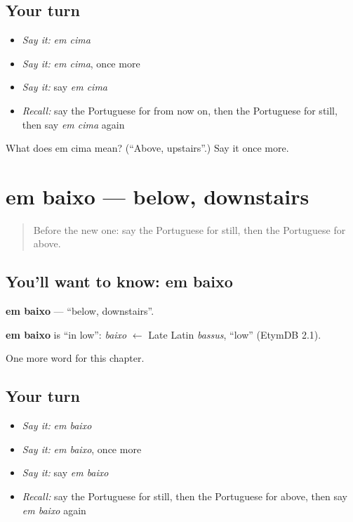 \subsection*{Your turn}
\begin{itemize}
\raggedright
  \item \emph{Say it:} \emph{em cima}
  \item \emph{Say it:} \emph{em cima}, once more
  \item \emph{Say it:} say \emph{em cima}
  \item \emph{Recall:} say the Portuguese for from now on, then the Portuguese for still, then say \emph{em cima} again
\end{itemize}

\begin{tcolorbox}[breakable,colback=teal!4,colframe=teal!35!black,title={Before you move on}]
What does em cima mean? (\textquotedblleft{}Above, upstairs\textquotedblright{}.) Say it once more.
\end{tcolorbox}
\section[em baixo]{em baixo — below, downstairs}

\label{lesson:PT-C151-em-baixo}



\begin{quote}
Before the new one: say the Portuguese for still, then the Portuguese for above.
\end{quote}

\subsection*{You'll want to know: em baixo}
\textbf{em baixo} — \textquotedblleft{}below, downstairs\textquotedblright{}.

\begin{cousinweb}
\textbf{em baixo} is \textquotedblleft{}in low\textquotedblright{}: \emph{baixo} $\leftarrow$ Late Latin \emph{bassus}, \textquotedblleft{}low\textquotedblright{} (EtymDB 2.1).
\end{cousinweb}

\begin{grammarlens}[title={What you've built}]
One more word for this chapter.
\end{grammarlens}

\subsection*{Your turn}
\begin{itemize}
\raggedright
  \item \emph{Say it:} \emph{em baixo}
  \item \emph{Say it:} \emph{em baixo}, once more
  \item \emph{Say it:} say \emph{em baixo}
  \item \emph{Recall:} say the Portuguese for still, then the Portuguese for above, then say \emph{em baixo} again
\end{itemize}

